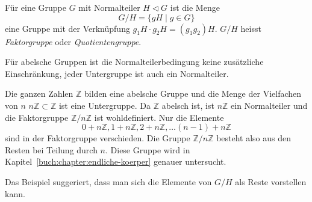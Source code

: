 \begin{definition}
Für eine Gruppe $G$ mit Normalteiler  $H\triangleleft G$ ist die
Menge
\[
G/H = \{ gH \;|\; g\in G\}
\]
eine Gruppe mit der Verknüpfung $g_1H\cdot g_2H=(g_1g_2)H$.
$G/H$ heisst {\em Faktorgruppe} oder {\em Quotientengruppe}.
%
%
\end{definition}

Für abelsche Gruppen ist die Normalteilerbedingung keine zusätzliche
Einschränkung, jeder Untergruppe ist auch ein Normalteiler.

\begin{beispiel}
Die ganzen Zahlen $\mathbb{Z}$ bilden eine abelsche Gruppe und
die Menge der Vielfachen von $n$
$n\mathbb{Z}\subset\mathbb{Z}$ ist eine Untergruppe.
Da $\mathbb{Z}$ abelsch ist, ist $n\mathbb{Z}$ ein Normalteiler
und die Faktorgruppe $\mathbb{Z}/n\mathbb{Z}$ ist wohldefiniert.
Nur die Elemente
\[
0+n\mathbb{Z},
1+n\mathbb{Z},
2+n\mathbb{Z},
\dots
(n-1)+n\mathbb{Z}
\]
sind in der Faktorgruppe verschieden.
Die Gruppe $\mathbb{Z}/n\mathbb{Z}$ besteht also aus den Resten
bei Teilung durch $n$.
Diese Gruppe wird in Kapitel~\ref{buch:chapter:endliche-koerper}
genauer untersucht.
\end{beispiel}

Das Beispiel suggeriert, dass man sich die Elemente von $G/H$
als Reste vorstellen kann.




